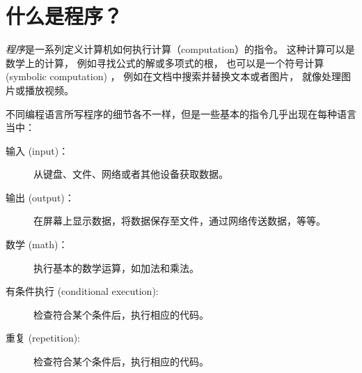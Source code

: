 \section{什么是程序？}



{\em 程序}是一系列定义计算机如何执行计算（computation）的指令。 这种计算可以是数学上的计算， 例如寻找公式的解或多项式的根， 也可以是一个符号计算 (symbolic  computation) ， 例如在文档中搜索并替换文本或者图片， 就像处理图片或播放视频。
  


不同编程语言所写程序的细节各不一样，但是一些基本的指令几乎出现在每种语言当中：


\begin{description}

\item[输入 (input)：] 从键盘、文件、网络或者其他设备获取数据。

\item[输出 (output)：] 在屏幕上显示数据，将数据保存至文件，通过网络传送数据，等等。

\item[数学 (math)：] 执行基本的数学运算，如加法和乘法。

\item[有条件执行 (conditional execution):] 检查符合某个条件后，执行相应的代码。

\item[重复 (repetition):] 检查符合某个条件后，执行相应的代码。

\end{description}

